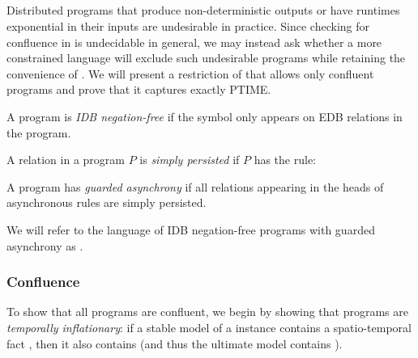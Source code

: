 \subsection{\large \bf \slang}

Distributed programs that produce non-deterministic outputs or have runtimes
exponential in their inputs are undesirable in practice. Since checking for
confluence in \lang is undecidable in general, we may instead ask whether a more
constrained language will exclude such undesirable programs while retaining the
convenience of \lang.  We will present a restriction of \lang that allows only
confluent programs and prove that it captures exactly PTIME.

\begin{definition}
A \lang program is {\em IDB negation-free} if the \dedalus{!} symbol only appears on EDB relations in the program.
\end{definition}

\begin{definition}
A relation  in a \lang program $P$ is {\em simply persisted} if $P$ has the rule: 
\end{definition}

\begin{definition}
A \lang program has {\em guarded asynchrony} if all relations appearing in the heads of asynchronous rules are simply persisted.
\end{definition}

We will refer to the language of IDB negation-free \lang programs with guarded
asynchrony as \slang.

\subsubsection{Confluence}

To show that all \slang programs are confluent, we begin by showing that \slang
programs are {\em temporally inflationary}: if a stable model of a \slang
instance contains a spatio-temporal fact , then it also contains
 (and thus the ultimate model contains ).

